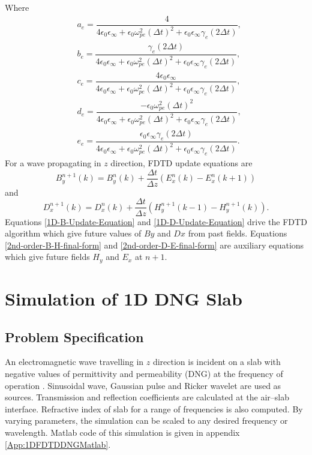 Where
\begin{eqnarray}
\nonumber & a_e=\dfrac{4}{4\epsilon_0\epsilon_\infty+\epsilon_0\omega^2_{pe}\left(\Delta t\right)^2+\epsilon_0\epsilon_\infty \gamma_e \left(2\Delta t\right)},\\
\nonumber & b_e=\dfrac{\gamma_e\left(2\Delta t\right)}{4\epsilon_0\epsilon_\infty+\epsilon_0\omega^2_{pe}\left(\Delta t\right)^2+\epsilon_0\epsilon_\infty \gamma_e \left(2\Delta t\right)},\\
\nonumber & c_e=\dfrac{4\epsilon_0\epsilon_\infty}{4\epsilon_0\epsilon_\infty+\epsilon_0\omega^2_{pe}\left(\Delta t\right)^2+\epsilon_0\epsilon_\infty \gamma_e \left(2\Delta t\right)},\\
\nonumber & d_e=\dfrac{-\epsilon_0\omega^2_{pe}\left(\Delta t\right)^2}{4\epsilon_0\epsilon_\infty+\epsilon_0\omega^2_{pe}\left(\Delta t\right)^2+\epsilon_0\epsilon_\infty \gamma_e \left(2\Delta t\right)},\\
\nonumber & e_e=\dfrac{\epsilon_0\epsilon_\infty \gamma_e\left(2\Delta t\right)}{4\epsilon_0\epsilon_\infty+\epsilon_0\omega^2_{pe}\left(\Delta t\right)^2+\epsilon_0\epsilon_\infty \gamma_e \left(2\Delta t\right)}.
\label{1D-Drude-E-scalars}
\end{eqnarray}
For a wave propagating in $z$ direction, FDTD update equations are
\begin{equation}
B^{n+1}_y(k)=B^n_y(k)+\dfrac{\Delta t}{\Delta z}\left(E^n_x(k)-E^n_x(k+1)\right)
\label{1D-B-Update-Equation}
\end{equation}
and
\begin{equation}
D^{n+1}_x(k)=D^n_x(k)+\dfrac{\Delta t}{\Delta z}\left(H^{n+1}_y(k-1)-H^{n+1}_y(k)\right).
\label{1D-D-Update-Equation}
\end{equation}
Equations \ref{1D-B-Update-Equation} and \ref{1D-D-Update-Equation} drive the FDTD algorithm which give future values of $By$ and $Dx$ from past fields. Equations \ref{2nd-order-B-H-final-form} and \ref{2nd-order-D-E-final-form} are auxiliary equations which give future fields $H_y$ and $E_x$ at $n+1$.
\section{Simulation of 1D DNG Slab}
\subsection{Problem Specification}
An electromagnetic wave travelling in $z$ direction is incident on a slab with negative values of permittivity and permeability (DNG) at the frequency of operation \cite{DNG-Ehud-Ziol}. Sinusoidal wave, Gaussian pulse and Ricker wavelet are used as sources. Transmission and reflection coefficients are calculated at the air--slab interface. Refractive index of slab for a range of frequencies is also computed. By varying parameters, the simulation can be scaled to any desired frequency or wavelength. Matlab code of this simulation is given in appendix \ref{App:1DFDTDDNGMatlab}.
